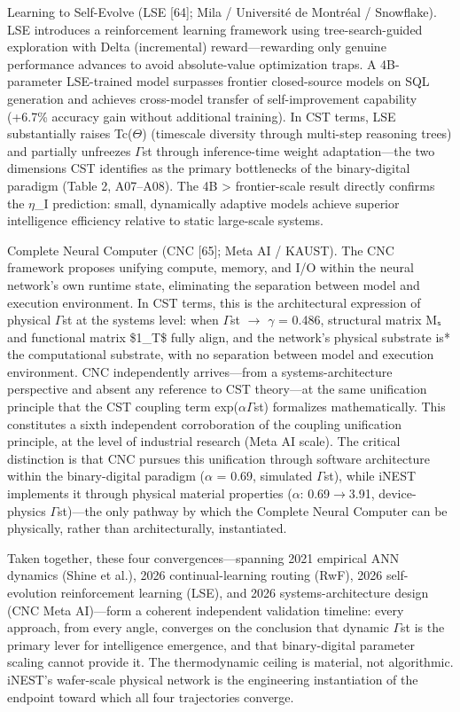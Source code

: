 \documentclass[a4paper,12pt]{article}
\begin{document}
Learning to Self-Evolve (LSE [64]; Mila / Université de Montréal / Snowflake). LSE introduces a reinforcement learning framework using tree-search-guided exploration with Delta (incremental) reward---rewarding only genuine performance advances to avoid absolute-value optimization traps. A 4B-parameter LSE-trained model surpasses frontier closed-source models on SQL generation and achieves cross-model transfer of self-improvement capability (+6.7\% accuracy gain without additional training). In CST terms, LSE substantially raises Tc($\Theta$) (timescale diversity through multi-step reasoning trees) and partially unfreezes $\Gamma$st through inference-time weight adaptation---the two dimensions CST identifies as the primary bottlenecks of the binary-digital paradigm (Table 2, A07--A08). The 4B > frontier-scale result directly confirms the $\eta$_I prediction: small, dynamically adaptive models achieve superior intelligence efficiency relative to static large-scale systems.


Complete Neural Computer (CNC [65]; Meta AI / KAUST). The CNC framework proposes unifying compute, memory, and I/O within the neural network's own runtime state, eliminating the separation between model and execution environment. In CST terms, this is the architectural expression of physical $\Gamma$st at the systems level: when $\Gamma$st $\rightarrow$ $\gamma$ = 0.486, structural matrix Mₛ and functional matrix \$1_{T}\$ fully align, and the network's physical substrate is* the computational substrate, with no separation between model and execution environment. CNC independently arrives—from a systems-architecture perspective and absent any reference to CST theory—at the same unification principle that the CST coupling term exp($\alpha$\cdot$\Gamma$st) formalizes mathematically. This constitutes a sixth independent corroboration of the coupling unification principle, at the level of industrial research (Meta AI scale). The critical distinction is that CNC pursues this unification through software architecture within the binary-digital paradigm ($\alpha$ = 0.69, simulated $\Gamma$st), while iNEST implements it through physical material properties ($\alpha$: 0.69$\rightarrow$3.91, device-physics $\Gamma$st)---the only pathway by which the Complete Neural Computer can be physically, rather than architecturally, instantiated.


Taken together, these four convergences---spanning 2021 empirical ANN dynamics (Shine et al.), 2026 continual-learning routing (RwF), 2026 self-evolution reinforcement learning (LSE), and 2026 systems-architecture design (CNC Meta AI)---form a coherent independent validation timeline: every approach, from every angle, converges on the conclusion that dynamic $\Gamma$st is the primary lever for intelligence emergence, and that binary-digital parameter scaling cannot provide it. The thermodynamic ceiling is material, not algorithmic. iNEST's wafer-scale physical network is the engineering instantiation of the endpoint toward which all four trajectories converge.
\end{document}
